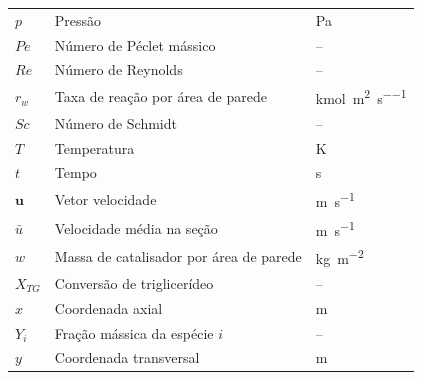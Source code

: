 \begin{center}
\begin{tabular}{p{2.2cm} p{8.6cm} p{3.0cm}}
$p$          & Pressão                                                & \si{\pascal} \\
$Pe$         & Número de Péclet mássico                               & -- \\
$Re$         & Número de Reynolds                                     & -- \\
$r_w$        & Taxa de reação por área de parede                      & \si{\kilo\mole\per\meter\squared\per\second} \\
$Sc$         & Número de Schmidt                                      & -- \\
$T$          & Temperatura                                            & \si{\kelvin} \\
$t$          & Tempo                                                  & \si{\second} \\
$\mathbf{u}$ & Vetor velocidade                                       & \si{\meter\per\second} \\
$\bar{u}$    & Velocidade média na seção                              & \si{\meter\per\second} \\
$w$          & Massa de catalisador por área de parede                & \si{\kilogram\per\meter\squared} \\
$X_{TG}$     & Conversão de triglicerídeo                             & -- \\
$x$          & Coordenada axial                                       & \si{\meter} \\
$Y_i$        & Fração mássica da espécie $i$                          & -- \\
$y$          & Coordenada transversal                                 & \si{\meter} \\
\hline
\end{tabular}
\end{center}

